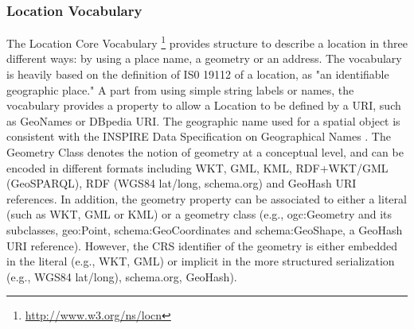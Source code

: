 \subsubsection{Location Vocabulary}
The Location Core Vocabulary \footnote{\url{http://www.w3.org/ns/locn}} provides structure to describe a location in three different ways: by using a place name, a geometry or an address. The vocabulary is heavily based on the definition of IS0 19112 of a location, as "an identifiable geographic place." A part from using simple string labels or names, the vocabulary provides a property to allow a Location to be defined by a URI, such as GeoNames or DBpedia URI. The geographic name used for a spatial object is consistent with the INSPIRE Data Specification on Geographical Names \cite{inspire2009}. The Geometry Class denotes the notion of geometry at a conceptual level, and can be encoded in different formats including WKT, GML, KML, RDF+WKT/GML (GeoSPARQL), RDF (WGS84 lat/long, schema.org) and GeoHash URI references. In addition, 
the geometry property can be associated to either a literal (such as WKT, GML or KML) or a geometry class (e.g., ogc:Geometry and its subclasses, geo:Point, schema:GeoCoordinates and schema:GeoShape, a GeoHash URI reference). However, the CRS identifier of the geometry is either embedded in the literal (e.g., WKT, GML) or implicit in the more structured serialization (e.g., WGS84 lat/long), schema.org, GeoHash).

